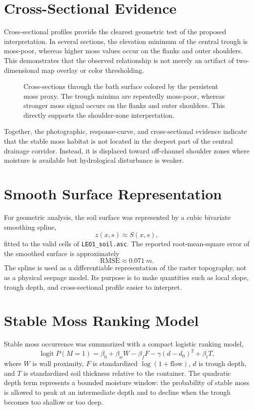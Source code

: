 \documentclass[11pt,a4paper]{article}
\newcommand{\logit}{\operatorname{logit}}
\begin{document}
\section{Cross-Sectional Evidence}

Cross-sectional profiles provide the clearest geometric test of the proposed
interpretation. In several sections, the elevation minimum of the central trough
is moss-poor, whereas higher moss values occur on the flanks and outer
shoulders. This demonstrates that the observed relationship is not merely an
artifact of two-dimensional map overlay or color thresholding.

\begin{figure}[H]
	\centering
	\caption{Cross-sections through the bath surface colored by the persistent
		moss proxy. The trough minima are repeatedly moss-poor, whereas stronger moss
		signal occurs on the flanks and outer shoulders. This directly supports the
		shoulder-zone interpretation.}
	\label{fig:moss-cross-sections}
\end{figure}

Together, the photographic, response-curve, and cross-sectional evidence
indicate that the stable moss habitat is not located in the deepest part of the
central drainage corridor. Instead, it is displaced toward off-channel shoulder
zones where moisture is available but hydrological disturbance is weaker.

\section{Smooth Surface Representation}

For geometric analysis, the soil surface was represented by a cubic bivariate
smoothing spline,
\[
  z(x,s) \approx S(x,s),
\]
fitted to the valid cells of \texttt{LEO1\_soil.asc}. The reported root-mean-square
error of the smoothed surface is approximately
\[
  \mathrm{RMSE} \approx \SI{0.071}{m}.
\]
The spline is used as a differentiable representation of the raster topography,
not as a physical seepage model. Its purpose is to make quantities such as
local slope, trough depth, and cross-sectional profile easier to interpret.

\section{Stable Moss Ranking Model}

Stable moss occurrence was summarized with a compact logistic ranking model,
\begin{equation}
  \logit P(M=1)
  =
  \beta_0
  + \beta_w W
  - \beta_f F
  - \gamma (d-d_0)^2
  + \beta_t T,
  \label{eq:ranking-model}
\end{equation}
where \(W\) is wall proximity, \(F\) is standardized \(\log(1+\mathrm{flow})\),
\(d\) is trough depth, and \(T\) is standardized soil thickness relative to the
container. The quadratic depth term represents a bounded moisture window: the
probability of stable moss is allowed to peak at an intermediate depth and to
decline when the trough becomes too shallow or too deep.
\end{document}
